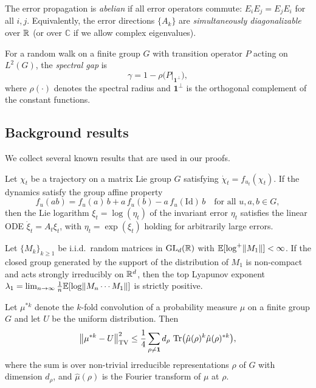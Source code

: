 \begin{definition}\label{def:abelian}
The error propagation is \emph{abelian} if all error operators commute:
$E_i E_j = E_j E_i$ for all $i, j$.  Equivalently, the error directions
$\{A_k\}$ are \emph{simultaneously diagonalizable} over $\mathbb{R}$
(or over $\mathbb{C}$ if we allow complex eigenvalues).
\end{definition}

\begin{definition}\label{def:spectral_gap}
For a random walk on a finite group $G$ with transition operator $P$
acting on $L^2(G)$, the \emph{spectral gap} is
\[
  \gamma = 1 - \rho\bigl(P\big|_{\mathbf{1}^\perp}\bigr),
\]
where $\rho(\cdot)$ denotes the spectral radius and $\mathbf{1}^\perp$
is the orthogonal complement of the constant functions.
\end{definition}

\subsection{Background results}

We collect several known results that are used in our proofs.

\begin{theorem}
\label{thm:bb}
Let $\chi_t$ be a trajectory on a matrix Lie group $G$ satisfying
$\dot{\chi}_t = f_{u_t}(\chi_t)$.  If the dynamics satisfy the group
affine property
\[
  f_u(ab) = f_u(a)\,b + a\,f_u(b) - a\,f_u(\mathrm{Id})\,b
  \quad \text{for all } u, a, b \in G,
\]
then the Lie logarithm $\xi_t = \log(\eta_t)$ of the invariant error
$\eta_t$ satisfies the linear ODE $\dot{\xi}_t = A_t \xi_t$, with
$\eta_t = \exp(\xi_t)$ holding for arbitrarily large errors.
\end{theorem}

\begin{theorem}\label{thm:furstenberg}
Let $\{M_k\}_{k \ge 1}$ be i.i.d.\ random matrices in $\operatorname{GL}_d(\mathbb{R})$
with $\mathbb{E}[\log^+ \lVert M_1 \rVert] < \infty$.  If the closed group generated
by the support of the distribution of $M_1$ is non-compact and acts
strongly irreducibly on $\mathbb{R}^d$, then the top Lyapunov exponent
$\lambda_1 = \lim_{n \to \infty} \frac{1}{n} \mathbb{E}[\log\lVert M_n \cdots M_1 \rVert]$
is strictly positive.
\end{theorem}

\begin{theorem}
\label{thm:diaconis_lemma}
Let $\mu^{*k}$ denote the $k$-fold convolution of a probability measure
$\mu$ on a finite group $G$ and let $U$ be the uniform distribution.
Then
\[
  \bigl\lVert \mu^{*k} - U \bigr\rVert_{\mathrm{TV}}^2
  \le \frac{1}{4} \sum_{\rho \ne \mathbf{1}} d_\rho \,
  \operatorname{Tr}\bigl(\hat{\mu}(\rho)^k \hat{\mu}(\rho)^{*k}\bigr),
\]
where the sum is over non-trivial irreducible representations $\rho$
of $G$ with dimension $d_\rho$, and $\hat{\mu}(\rho)$ is the Fourier
transform of $\mu$ at $\rho$.
\end{theorem}
